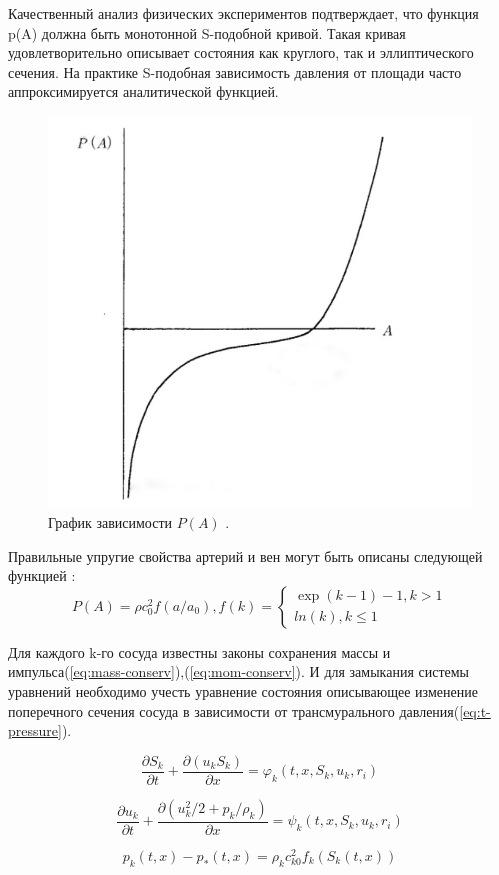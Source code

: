 Качественный анализ физических экспериментов подтверждает, что функция p(A) должна быть монотонной S-подобной кривой. Такая кривая удовлетворительно описывает  состояния как круглого, так и эллиптического сечения. На практике S-подобная  зависимость давления от площади часто аппроксимируется аналитической функцией. 

\begin{figure}[h]
\centering
\includegraphics[width=0.3\linewidth]{IMG_20230309_021324_943-01.jpeg}
\caption{ График зависимости $P(A)$ \cite{pedly:1998}.}
\label{fig:mpr}
\end{figure}

Правильные упругие свойства артерий и вен могут быть описаны следующей функцией \cite{holodov:2001}:
\begin{equation}
    \label{eq:elastic-propeties}
    P(A)=\rho c^2_0 f(a/a_0), 
    f(k)=\begin{cases}
    \exp(k-1)-1, k>1 \\ ln(k), k \leq 1
    \end{cases}
\end{equation}

Для каждого k-го сосуда известны законы сохранения массы и импульса(\ref{eq:mass-conserv}),(\ref{eq:mom-conserv}). И для замыкания системы уравнений необходимо учесть уравнение состояния описывающее изменение поперечного сечения сосуда в зависимости от трансмурального давления(\ref{eq:t-pressure}).

\begin{equation}
    \label{eq:mass-conserv}
    \frac{\partial S_k}{ \partial t} + \frac{\partial(u_kS_k)}{\partial x}=\varphi _k(t,x,S_k,u_k,r_i)
\end{equation}

\begin{equation}
    \label{eq:mom-conserv}
    \frac{\partial u_k}{\partial t} + \frac{\partial(u_k^2/2+p_k/\rho_k)}{\partial x}= \psi_k(t,x,S_k,u_k,r_i)
\end{equation}

\begin{equation}
    \label{eq:t-pressure}
    p_k(t,x)-p_*(t,x)=\rho_k c^2_{k0}f_k(S_k(t,x))
\end{equation}

